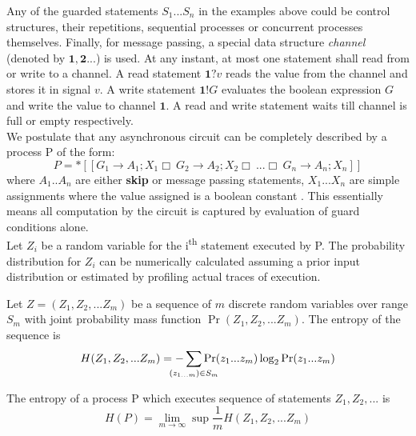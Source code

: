 Any of the guarded statements $S_1... S_n$ in the examples above could be 
control structures, their repetitions, sequential processes or concurrent processes themselves. 
Finally, for message passing, a special data structure \emph{channel} (denoted
by $\mathbf{1}, \mathbf{2}...$) is used. 
At any instant, at most one statement shall read from or write to a channel.
A read statement $\mathbf{1} ? v$ reads the value from the channel and stores
it in signal $v$. A write statement $\mathbf{1} ! G$ evaluates the boolean
expression $G$ and write the value to channel $\mathbf{1}$. A read and write
statement waits till channel is full or empty respectively.
\\

We postulate that any asynchronous circuit can be completely described 
by a process P of the form:
\begin{equation} \label{eq:basic_csp}
	P = *[[ G_1 \to A_1; X_1 \Box\ G_2 \to A_2; X_2 \Box\ ... \Box\ G_n \to
	A_n; X_n ]]
\end{equation}
where $A_1.. A_n$ are either \textbf{skip} or message passing
statements, $X_1... X_n$ are simple assignments where the value assigned is a
boolean constant \cite{entropy_paper}.
This essentially means all computation by the circuit is captured by
evaluation of guard conditions alone.
\\

Let $Z_i$ be a random variable for the i\textsuperscript{th} statement executed by P. 
The probability distribution for $Z_i$ can be numerically calculated assuming a
prior input distribution or estimated by profiling actual traces of execution.
\\

\begin{defn}[Entropy]
	Let $Z = (Z_1, Z_2, ... Z_m)$ be a sequence of $m$ discrete random variables over
	range $S_m$ with joint probability mass function $\Pr(Z_1, Z_2, ... Z_m)$. 
	The entropy of the sequence is 
	\begin{equation}
		H(Z_1, Z_2, ... Z_m) = - \sum_{\mathclap{(z_{1...m}) \in S_m}} 
				\Pr(z_1 ... z_m) \log_2{\Pr(z_1... z_m)}
	\end{equation}
\end{defn}
\begin{defn}
	The entropy of a process P which executes sequence of statements $Z_1, Z_2, ...$ is 
	\begin{equation}
		H(P) = \lim_{m \to \infty}{ \sup \frac{1}{m} H(Z_1, Z_2, ... Z_m)}
	\end{equation}
\end{defn}


